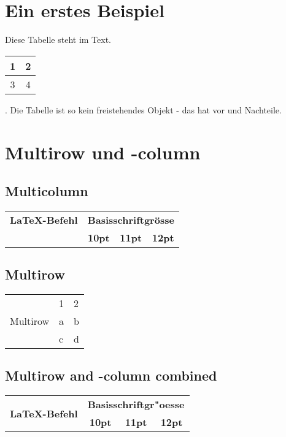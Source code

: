 \documentclass[10pt, a4paper,landscape]{article}
\begin{document}
\section{Ein erstes Beispiel}
Diese Tabelle steht im Text.
\begin{tabular}[c]{c|c}
\hline
1 & 2 \\
\hline 
3 & 4\\
\hline
\end{tabular}. Die Tabelle ist so kein freistehendes Objekt - das hat vor und Nachteile.

\section{Multirow und -column}

\setlength{\tabcolsep}{5pt} %

\subsection{Multicolumn}

\begin{tabular}{lccc}
\hline
\textbf{\LaTeX-Befehl} & \multicolumn{3}{c}{\textbf{Basisschriftgrösse}}\\
\cline{2-4} & \textbf{10pt} & \textbf{11pt} & \textbf{12pt}\\
\hline
\end{tabular}

\subsection{Multirow}

\begin{tabular}{lll}
\hline
\multirow{3}{*}{Multirow} & 1 & 2 \\
 & a & b \\
 & c & d \\
\hline
\end{tabular}

\subsection{Multirow and -column combined}

\begin{tabular}{lccc}
\hline
\multirow{2}{5cm}{\centering\textbf{\LaTeX-Befehl}} & \multicolumn{3}{c}{\textbf{Basisschriftgr"oesse}} \\
& \textbf{10pt} & \textbf{11pt} & \textbf{12pt} \\
\hline
\end{tabular}
\end{document}
